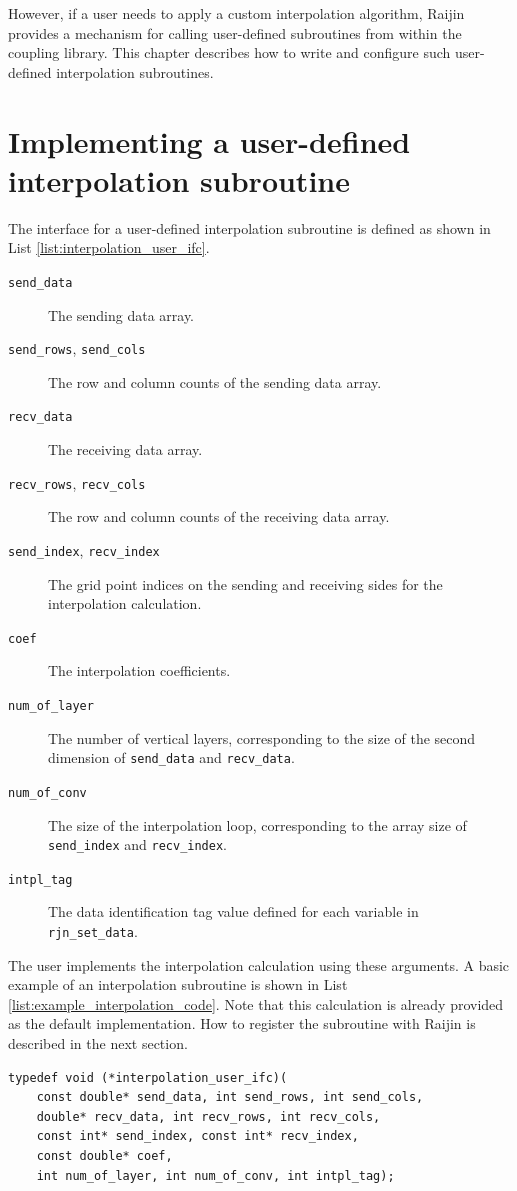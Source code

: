 \documentclass[11pt,a4paper]{report}
\newcommand{\lstref}[1]{List \ref{#1}}
\begin{document}
However, if a user needs to apply
a custom interpolation algorithm,
Raijin provides a mechanism
for calling user-defined subroutines
from within the coupling library.
This chapter describes how to write
and configure such user-defined
interpolation subroutines.

\section{Implementing a user-defined interpolation subroutine}

The interface for a user-defined interpolation subroutine
is defined as shown in \lstref{list:interpolation_user_ifc}.

\begin{description}
\item[\texttt{send\_data}]
  The sending data array.
\item[\texttt{send\_rows}, \texttt{send\_cols}]
  The row and column counts of the sending data array.
\item[\texttt{recv\_data}]
  The receiving data array.
\item[\texttt{recv\_rows}, \texttt{recv\_cols}]
  The row and column counts of the receiving data array.
\item[\texttt{send\_index}, \texttt{recv\_index}]
  The grid point indices on the sending and receiving sides
  for the interpolation calculation.
\item[\texttt{coef}]
  The interpolation coefficients.
\item[\texttt{num\_of\_layer}]
  The number of vertical layers,
  corresponding to the size of the second dimension
  of \texttt{send\_data} and \texttt{recv\_data}.
\item[\texttt{num\_of\_conv}]
  The size of the interpolation loop,
  corresponding to the array size
  of \texttt{send\_index} and \texttt{recv\_index}.
\item[\texttt{intpl\_tag}]
  The data identification tag value
  defined for each variable
  in \texttt{rjn\_set\_data}.
\end{description}

The user implements the interpolation calculation
using these arguments.
A basic example of an interpolation subroutine
is shown in \lstref{list:example_interpolation_code}.
Note that this calculation is already provided
as the default implementation.
How to register the subroutine with Raijin
is described in the next section.

\begin{lstlisting}[caption=Interface of user-defined interpolation subroutine,
                    label=list:interpolation_user_ifc]
typedef void (*interpolation_user_ifc)(
    const double* send_data, int send_rows, int send_cols,
    double* recv_data, int recv_rows, int recv_cols,
    const int* send_index, const int* recv_index,
    const double* coef,
    int num_of_layer, int num_of_conv, int intpl_tag);
\end{lstlisting}
\end{document}
